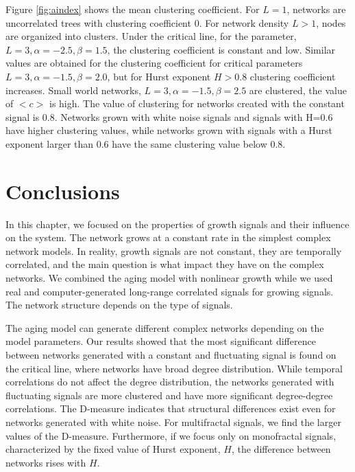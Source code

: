 Figure \ref{fig:aindex} shows the mean clustering coefficient. For $L=1$, networks are uncorrelated trees with clustering coefficient $0$. For network density $L>1$, nodes are organized into clusters. Under the critical line, for the parameter, $L=3, \alpha=-2.5, \beta=1.5 $, the clustering coefficient is constant and low. Similar values are obtained for the clustering coefficient for critical parameters $L=3, \alpha=-1.5, \beta=2.0$, but for Hurst exponent $H>0.8$ clustering coefficient increases. Small world networks,  $L=3, \alpha=-1.5, \beta=2.5$ are clustered, the value of $<c>$ is high.  The value of clustering for networks created with the constant signal is 0.8. Networks grown with white noise signals and signals with H=0.6 have higher clustering values, while networks grown with signals with a Hurst exponent larger than 0.6 have the same clustering value below 0.8. 

\section{Conclusions}

In this chapter, we focused on the properties of growth signals and their influence on the system. The network grows at a constant rate in the simplest complex network models. In reality, growth signals are not constant, they are temporally correlated, and the main question is what impact they have on the complex networks. We combined the aging model with nonlinear growth while we used real and computer-generated long-range correlated signals for growing signals. The network structure depends on the type of signals.

The aging model can generate different complex networks depending on the model parameters. Our results showed that the most significant difference between networks generated with a constant and fluctuating signal is found on the critical line, where networks have broad degree distribution. While temporal correlations do not affect the degree distribution, the networks generated with fluctuating signals are more clustered and have more significant degree-degree correlations. The D-measure indicates that structural differences exist even for networks generated with white noise. For multifractal signals, we find the larger values of the D-measure. Furthermore, if we focus only on monofractal signals, characterized by the fixed value of Hurst exponent, $H$, the difference between networks rises with $H$. 

